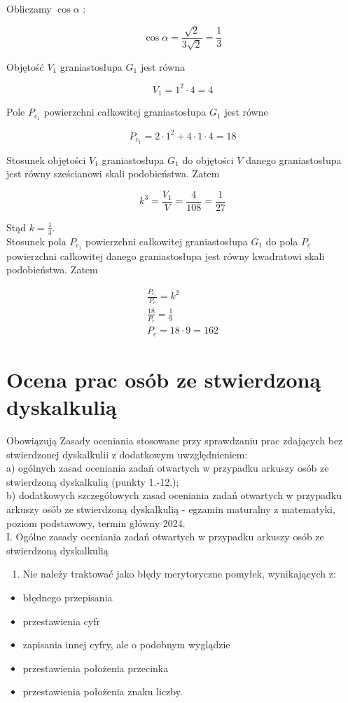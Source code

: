 \documentclass[10pt]{article}
\begin{document}
Obliczamy $\cos \alpha$ :

$$
\cos \alpha=\frac{\sqrt{2}}{3 \sqrt{2}}=\frac{1}{3}
$$

Objętość $V_{1}$ graniastosłupa $G_{1}$ jest równa

$$
V_{1}=1^{2} \cdot 4=4
$$

Pole $P_{c_{1}}$ powierzchni całkowitej graniastosłupa $G_{1}$ jest równe

$$
P_{c_{1}}=2 \cdot 1^{2}+4 \cdot 1 \cdot 4=18
$$

Stosunek objętości $V_{1}$ graniastosłupa $G_{1}$ do objętości $V$ danego graniastosłupa jest równy sześcianowi skali podobieństwa. Zatem

$$
k^{3}=\frac{V_{1}}{V}=\frac{4}{108}=\frac{1}{27}
$$

Stąd $k=\frac{1}{3}$.\\
Stosunek pola $P_{c_{1}}$ powierzchni całkowitej graniastosłupa $G_{1}$ do pola $P_{c}$ powierzchni całkowitej danego graniastosłupa jest równy kwadratowi skali podobieństwa. Zatem

$$
\begin{gathered}
\frac{P_{c_{1}}}{P_{c}}=k^{2} \\
\frac{18}{P_{c}}=\frac{1}{9} \\
P_{c}=18 \cdot 9=162
\end{gathered}
$$

\section*{Ocena prac osób ze stwierdzoną dyskalkulią}
Obowiązują Zasady oceniania stosowane przy sprawdzaniu prac zdających bez stwierdzonej dyskalkulii z dodatkowym uwzględnieniem:\\
a) ogólnych zasad oceniania zadań otwartych w przypadku arkuszy osób ze stwierdzoną dyskalkulią (punkty 1.-12.);\\
b) dodatkowych szczegółowych zasad oceniania zadań otwartych w przypadku arkuszy osób ze stwierdzoną dyskalkulią - egzamin maturalny z matematyki, poziom podstawowy, termin główny 2024.\\
I. Ogólne zasady oceniania zadań otwartych w przypadku arkuszy osób ze stwierdzoną dyskalkulią

\begin{enumerate}
  \item Nie należy traktować jako błędy merytoryczne pomyłek, wynikających z:
\end{enumerate}

\begin{itemize}
  \item błędnego przepisania
  \item przestawienia cyfr
  \item zapisania innej cyfry, ale o podobnym wyglądzie
  \item przestawienia położenia przecinka
  \item przestawienia położenia znaku liczby.
\end{itemize}
\end{document}
